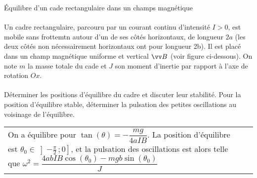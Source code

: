 \documentclass[french, a4paper, 11pt]{article}
\newcommand{\interof}[2]{\left]#1\,;#2\right]}   %
\begin{document}
\begin{cadre}{Équilibre d'un cade rectangulaire dans un champs magnétique}
    \paragraph*{}
    Un cadre rectangulaire, parcouru par un courant continu d'intensité \(I>0\), est mobile sans frottemtn autour d'un de ses côtés
    horizontaux, de longueur \(2a\) (les deux côtés non nécessairement horizontaux ont pour longueur 2b). Il est placé dans un champ
    magnétique uniforme et vertical \(\vv B\) (voir figure ci-dessous). On note \(m\) la masse totale du cade et \(J\) son moment d'inertie
    par rapport à l'axe de rotation \(Ox\).

    \begin{center}
    \end{center}
    
    \paragraph*{}
    Déterminer les positions d'équilibre du cadre et discuter leur stabilité. Pour la position d'équilibre stable, déterminer
    la pulsation des petites oscillations au voisinage de l'équilibre.

    \tcblower
    \begin{tabularx}{\linewidth}{Xr}
        On a équilibre pour \(\tan(\theta)=-\dfrac{mg}{4aIB}\). La position d'équilibre est \(\theta_0 \in \interof{-\frac{\pi}{2}}{0}\),
        et la pulsation des oscillations est alors telle que \(\omega^2=\dfrac{4abIB\cos(\theta_0)-mgb\sin(\theta_0)}{J}\)
    \end{tabularx}
\end{cadre}
\end{document}
